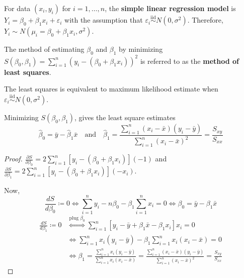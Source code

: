 \begin{definition}
    For data $ (x_i,y_i) $ for $ i=1,\ldots,n $, the
    \textbf{simple linear regression model} is
    $ Y_i=\beta_0+\beta_1x_i+\varepsilon_i $
    with the assumption that
    $ \varepsilon_i\stackrel{\text{iid}}{\sim}N(0,\sigma^2) $.
    Therefore,
    $ Y_i\sim N(\mu_i=\beta_0+\beta_1x_i,\sigma^2) $.
\end{definition}
\begin{definition}
    The method of estimating $ \beta_0 $
    and $ \beta_1 $ by minimizing
    $ S(\beta_0,\beta_1)=\sum_{i=1}^{n}(y_i-(\beta_0+\beta_1x_i))^2 $
    is referred to as the \textbf{method of least squares}.
\end{definition}
\begin{remark}
    The least squares is equivalent to maximum likelihood estimate
    when $ \varepsilon_i\stackrel{\text{iid}}{\sim}N(0,\sigma^2) $.
\end{remark}
\begin{theorem}
    Minimizing $ S(\beta_0,\beta_1) $, gives the
    least square estimates
    \[ \hat{\beta}_0=\bar{y}-\hat{\beta}_1\bar{x}\quad\text{and}
        \quad
        \hat{\beta}_1=
        \frac{\sum_{i=1}^{n} (x_i-\bar{x})(y_i-\bar{y})}{
            \sum_{i=1}^{n} (x_i-\bar{x})^2
        }=\frac{S_{xy}}{S_{xx}}   \]
\end{theorem}
\begin{proof}
    $ \displaystyle \frac{\partial S}{\partial\beta_0}=2
        \sum\limits_{i=1}^{n} \left[ y_i-(\beta_0+\beta_1x_i) \right](-1)
    $ and $ \displaystyle
        \frac{\partial S}{\partial\beta_1}=2
        \sum\limits_{i=1}^{n} \left[ y_i-(\beta_0+\beta_1x_i) \right](-x_i) $.

    Now,
    \[ \frac{dS}{d\beta_0}\coloneq 0
        \iff \sum\limits_{i=1}^{n}y_i-n\beta_0-
        \beta_1 \sum\limits_{i=1}^{n} x_i=0
        \iff \beta_0=\bar{y}-\beta_1\bar{x} \]
    \begin{align*}
        \frac{dS}{d\beta_1}\coloneq 0
         & \stackrel{\text{plug }\beta_0}{\iff}
        \sum\limits_{i=1}^{n} \left[ y_i-\bar{y}+\beta_1\bar{x}-\beta_1 x_i \right]x_i=0 \\
         & \iff \sum\limits_{i=1}^{n} x_i(y_i-\bar{y})-\beta_1
        \sum\limits_{i=1}^{n} x_i(x_i-\bar{x})=0                                         \\
         & \iff \beta_1=\frac{\sum_{i=1}^{n} x_i(y_i-\bar{y})}{\sum_{i=1}^{n}
            x_i
            (x_i-\bar{x})}=\frac{\sum_{i=1}^{n}(x_i-\bar{x})
            (y_i-\bar{y})}{
            \sum_{i=1}^{n} (x_i-\bar{x})^2
        }=\frac{S_{xy}}{S_{xx}}
    \end{align*}
\end{proof}
